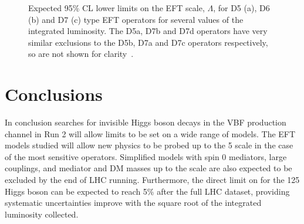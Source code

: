 \begin{figure}
  \caption{Expected 95\% \ac{CL} lower limits on the \ac{EFT} scale, $\Lambda$, for D5 (a), D6 (b) and D7 (c) type \ac{EFT} operators for several values of the integrated luminosity. The D5a, D7b and D7d operators have very similar exclusions to the D5b, D7a and D7c operators respectively, so are not shown for clarity~\cite{ourdmpaper}.}
  \label{fig:eftlimits}
\end{figure}

\section{Conclusions}
\label{sec:dmconclusions}
In conclusion searches for invisible Higgs boson decays in the \ac{VBF} production channel in Run 2 will allow limits to be set on a wide range of models. The \ac{EFT} models studied will allow new physics to be probed up to the 5 \TeV scale in the case of the most sensitive operators. Simplified models with spin 0 mediators, large couplings, and mediator and \ac{DM} masses  up to the \TeV scale are also expected to be excluded by the end of LHC running. Furthermore, the direct limit on \BRinv for the 125 \GeV Higgs boson can be expected to reach 5\% after the full LHC dataset, providing systematic uncertainties improve with the square root of the integrated luminosity collected.

